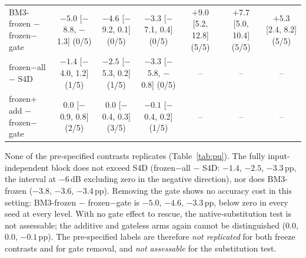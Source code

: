 \begin{table}[htbp]
\begin{tabular}{@{}lcccccc@{}}
\shortstack[l]{BM3-frozen\\ $-$ frozen$-$gate} & \shortstack{$-5.0$\\ {[}$-$8.8, $-$1.3{]}\\ (0/5)} & \shortstack{$-4.6$\\ {[}$-$9.2, 0.1{]}\\ (0/5)} & \shortstack{$-3.3$\\ {[}$-$7.1, 0.4{]}\\ (0/5)} & \shortstack{$+9.0$\\ {[}5.2, 12.8{]}\\ (5/5)} & \shortstack{$+7.7$\\ {[}5.0, 10.4{]}\\ (5/5)} & \shortstack{$+5.3$\\ {[}2.4, 8.2{]}\\ (5/5)} \\[3pt]
\shortstack[l]{frozen$-$all\\ $-$ S4D} & \shortstack{$-1.4$\\ {[}$-$4.0, 1.2{]}\\ (1/5)} & \shortstack{$-2.5$\\ {[}$-$5.3, 0.2{]}\\ (1/5)} & \shortstack{$-3.3$\\ {[}$-$5.8, $-$0.8{]}\\ (0/5)} & -- & -- & -- \\[3pt]
\shortstack[l]{frozen$+$add\\ $-$ frozen$-$gate} & \shortstack{$0.0$\\ {[}$-$0.9, 0.8{]}\\ (2/5)} & \shortstack{$0.0$\\ {[}$-$0.4, 0.3{]}\\ (3/5)} & \shortstack{$-0.1$\\ {[}$-$0.4, 0.2{]}\\ (1/5)} & -- & -- & -- \\[3pt]
\bottomrule
\end{tabular}
\end{table}

None of the pre-specified contrasts replicates (Table~\ref{tab:pu}). The fully input-independent block does not exceed S4D (frozen$-$all $-$ S4D: $-1.4$, $-2.5$, $-3.3$\,pp, the interval at $-6$\,dB excluding zero in the negative direction), nor does BM3-frozen ($-3.8$, $-3.6$, $-3.4$\,pp). Removing the gate shows no accuracy cost in this setting: BM3-frozen $-$ frozen$-$gate is $-5.0$, $-4.6$, $-3.3$\,pp, below zero in every seed at every level. With no gate effect to rescue, the native-substitution test is not assessable; the additive and gateless arms again cannot be distinguished ($0.0$, $0.0$, $-0.1$\,pp). The pre-specified labels are therefore \emph{not replicated} for both freeze contrasts and for gate removal, and \emph{not assessable} for the substitution test.


